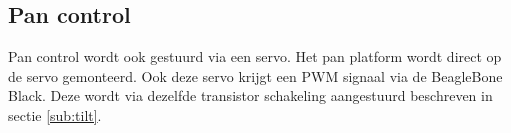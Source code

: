 \subsection{Pan control}

Pan control wordt ook gestuurd via een servo. Het pan platform wordt direct op de servo
gemonteerd. Ook deze servo krijgt een PWM signaal via de BeagleBone Black. Deze wordt
via dezelfde transistor schakeling aangestuurd beschreven in sectie \ref{sub:tilt}.

